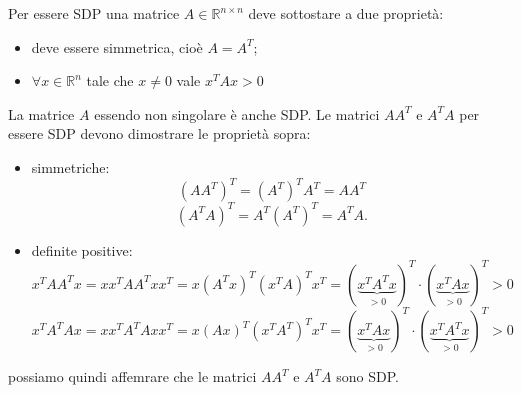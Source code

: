 \begin{flushleft}
Per essere SDP una matrice $A \in \mathbb{R}^{n \times n}$ deve sottostare a due proprietà:
\begin{itemize}
    \item
    deve essere simmetrica, cioè $A=A^T$;
    \item 
    $\forall x \in \mathbb{R}^n$ tale che $x \neq 0$ vale $x^TAx>0$
\end{itemize}
La matrice $A$ essendo non singolare è anche SDP.
Le matrici $AA^T$ e $A^TA$ per essere SDP devono dimostrare le proprietà sopra:
\begin{itemize}
    \item simmetriche: 
    \[
    (AA^T)^T = (A^T)^TA^T = AA^T
    \]
    \[
    (A^TA)^T = A^T(A^T)^T = A^TA.
    \]
    \item definite positive:
    \[
    x^TAA^Tx = xx^TAA^Txx^T = x(A^Tx)^T(x^TA)^Tx^T = (\underbrace{x^TA^Tx}_{>0})^T \cdot (\underbrace{x^TAx}_{>0})^T > 0
    \]
    \[
    x^TA^TAx = xx^TA^TAxx^T = x(Ax)^T(x^TA^T)^Tx^T = (\underbrace{x^TAx}_{>0})^T \cdot (\underbrace{x^TA^Tx}_{>0})^T > 0
    \]
\end{itemize}
possiamo quindi affemrare che le matrici $AA^T$ e $A^TA$ sono SDP.
\end{flushleft}